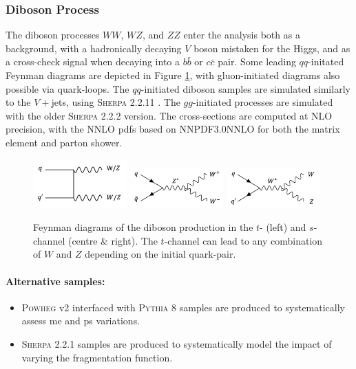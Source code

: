 \subsubsection{Diboson Process}
The diboson processes $WW$, $WZ$, and $ZZ$ enter the analysis both as a background, with a hadronically decaying $V$ boson mistaken for the Higgs, and as a cross-check signal when decaying into a $b\bar{b}$ or $c\bar{c}$ pair. Some leading $qq$-initated Feynman diagrams are depicted in Figure \ref{fig:feyndiV}, with gluon-initiated diagrams also possible via quark-loops. The $qq$-initiated diboson samples are simulated similarly to the $V+$jets, using \textsc{Sherpa} 2.2.11 \cite{10.21468/SciPostPhys.7.3.034}. The $gg$-initiated processes are simulated with the older \textsc{Sherpa} 2.2.2 version. The cross-sections are computed at NLO precision, with the NNLO \glspl{pdf} based on NNPDF3.0NNLO \cite{PDFLHCrun2} for both the matrix element and parton shower.
\begin{figure}[h!]
  \center
  \includegraphics[width=0.32\textwidth]{Images/VH/Feynman/diboson.png}
  \includegraphics[width=0.32\textwidth]{Images/VH/Feynman/diW.png}
  \includegraphics[width=0.32\textwidth]{Images/VH/Feynman/diWZ.png}
  \caption{Feynman diagrams of the diboson production in the $t$- (left) and $s$-channel (centre \& right). The $t$-channel can lead to any combination of $W$ and $Z$ depending on the initial quark-pair.}
  \label{fig:feyndiV}
\end{figure}

\paragraph{Alternative samples:}
\begin{itemize}
  \item \textsc{Powheg} v2 interfaced with \textsc{Pythia} 8 samples are produced to systematically assess \gls{me} and \gls{ps} variations. 
  \item \textsc{Sherpa} 2.2.1 samples are produced to systematically model the impact of varying the fragmentation function. 
\end{itemize}


